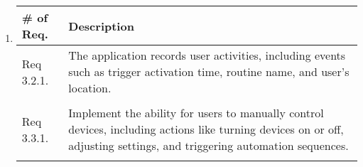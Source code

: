 \begin{enumerate}[label=\arabic*.]
          \begin{enumerate}[label=\alph*]
              \item 

                \begin{table}[H]
                        \center
                        \begin{tabular}{m{1.4cm} m{5.5cm}}
                            \toprule
                            \# of Req. & Description                                                                                                                   \\
                            \midrule
                            Req 3.2.1.   & The application records user activities, including events such as trigger activation time, routine name, and user's location. \\\\
                            Req 3.3.1.   & Implement the ability for users to manually control devices, including actions like turning devices on or off, adjusting settings, and triggering automation sequences.                     \\\\
                            \bottomrule
                        \end{tabular}
                    \end{table}
                
                        

\end{enumerate}
\end{enumerate}
